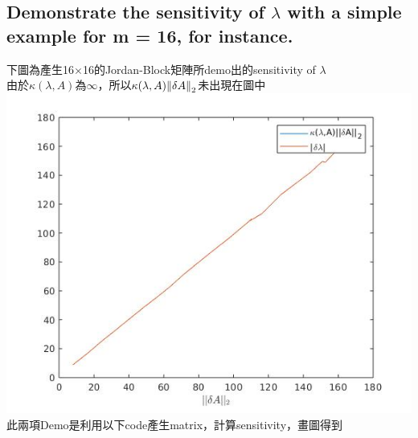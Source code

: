 \documentclass[12pt]{article}
\begin{document}
    \subsection*{Demonstrate the sensitivity of $\lambda$ with a simple example for m = 16, for instance.}
        下圖為產生16$\times$16的Jordan-Block矩陣所demo出的sensitivity of $\lambda$\\
        由於$\kappa(\lambda,A)$為$\infty$，所以$\kappa(\lambda,A)\norm{\delta A}_2$未出現在圖中\\
        \includegraphics[scale = 0.75]{Jordan_demo.jpg}\\
此兩項Demo是利用以下code產生matrix，計算sensitivity，畫圖得到
\end{document}
